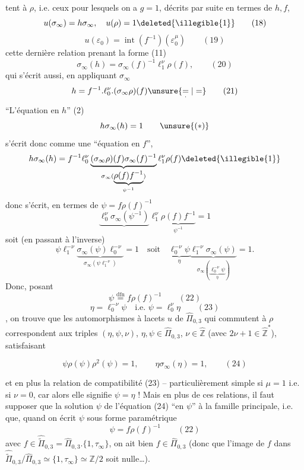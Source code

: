 tent à $\rho$, i.e. ceux pour lesquels on a $g=1$, décrits par suite en termes de $h,f$,
\[
u(\sigma_\infty)=h\sigma_\infty,\quad u(\rho)=1\deleted{\illegible{1}}
\qquad (18)
\]
\[
u(\varepsilon_0)=\operatorname{int}(f^{-1})(\varepsilon_0^\mu)
\qquad (19)
\]
cette dernière relation prenant la forme (11)
\[
\sigma_\infty(h)=\sigma_\infty(f)^{-1}\ell_1^\nu\rho(f),
\qquad (20)
\]
qui s'écrit aussi, en appliquant $\sigma_\infty$
\[
h=f^{-1}.\ell_0^\nu.(\sigma_\infty\rho)(f)\unsure{\underset{\cdot}{=}|=}
\qquad (21)
\]
``L'équation en $h$'' (2) 
\[
h\sigma_\infty(h)=1
\qquad \unsure{(*)}
\]
s'écrit donc comme une ``équation en $f$'',  
\[
h\sigma_\infty(h)=f^{-1}\ell_0^\nu
\underbrace{(\sigma_\infty\rho)(f)\sigma_\infty(f)^{-1}}_{\sigma_\infty(\underbrace{\rho(f)f^{-1}}_{\psi^{-1}})}
\ell_1^\nu\rho(f)\deleted{\illegible{1}}
\]
donc  s'écrit, en termes de $\psi=f\rho(f)^{-1}$
\[
\underbrace{\ell_0^\nu\sigma_\infty(\psi^{-1})}\ell_1^\nu
\underbrace{\rho(f)f^{-1}}_{\psi^{-1}}=1
\]
soit (en passant à l'inverse)
\[
\psi\ell_1^{-\nu}\underbrace{\sigma_\infty(\psi)\ell_0^{-\nu}}_{\sigma_\infty(\psi\ell_1^{-\nu})}=1
\quad\text{soit}\quad
\underbrace{\ell_0^{-\nu}\psi}_{\eta}
\underbrace{\ell_1^{-\nu}\sigma_\infty(\psi)}_{\sigma_\infty(\underbrace{\ell_0^{-\nu}\psi}_{\eta})}=1.
\]
Donc, posant
\[
\psi\overset{\mathrm{dfn}}{=}f\rho(f)^{-1}
\qquad (22)
\]
\[
\boxed{\eta=\ell_0^{-\nu}\psi\quad\text{i.e. }\psi=\ell_0^\nu\eta}
\qquad (23)
\]
, on trouve que les automorphismes à lacets $u$ de $\widehat{\Pi}_{0,3}$ qui commutent à $\rho$ correspondent aux triples $(\eta,\psi,\nu)$, $\eta,\psi\in\widehat{\Pi}_{0,3}$, $\nu\in\widehat{\mathbb Z}$ (avec $2\nu+1\in\widehat{\mathbb Z}^{*}$), satisfaisant



\[
\boxed{\psi\rho(\psi)\rho^2(\psi)=1,\qquad\eta\sigma_\infty(\eta)=1},
\qquad (24)
\]

et en plus la relation de compatibilité (23) -- particulièrement simple si $\mu=1$ i.e. si $\nu=0$, car alors elle signifie $\psi=\eta$ ! Mais en plus de ces relations, il faut supposer que la solution $\psi$ de l'équation (24) ``en $\psi$''  à la famille principale, i.e. que, quand on écrit $\psi$ sous forme paramétrique
\[
\psi=f\rho(f)^{-1}
\qquad (22)
\]
avec $f\in\widehat{\widetilde{\Pi}}_{0,3}=\widehat{\Pi}_{0,3}.\{1,\tau_\infty\}$, on ait bien $f\in\widehat{\Pi}_{0,3}$ (donc que l'image de $f$ dans $\widehat{\widetilde{\Pi}}_{0,3}/\widehat{\Pi}_{0,3}\simeq\{1,\tau_\infty\}\simeq\mathbb Z/2$ soit nulle\dots).

